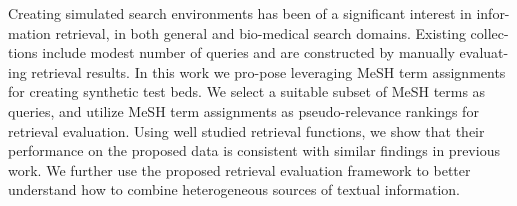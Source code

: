Creating simulated search environments has been of a significant interest in infor-mation retrieval, in both general and bio-medical search domains. Existing collec-tions include modest number of queries and are constructed by manually evaluat-ing retrieval results. In this work we pro-pose leveraging MeSH term assignments for creating synthetic test beds. We select a suitable subset of MeSH terms as queries, and utilize MeSH term assignments as pseudo-relevance rankings for retrieval evaluation. Using well studied retrieval functions, we show that their performance on the proposed data is consistent with similar findings in previous work. We further use the proposed retrieval evaluation framework to better understand how to combine heterogeneous sources of textual information.

